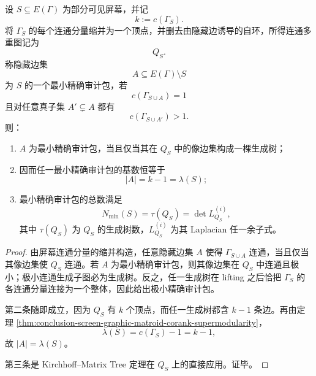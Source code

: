 \begin{theorem}\label{thm:conclusion-screen-minimal-exact-audit-tree-kirchhoff-count}
设 \(S\subseteq E(\Gamma)\) 为部分可见屏幕，并记
\[
k:=c(\Gamma_S).
\]
将 \(\Gamma_S\) 的每个连通分量缩并为一个顶点，并删去由隐藏边诱导的自环，所得连通多重图记为
\[
Q_S.
\]
称隐藏边集
\[
A\subseteq E(\Gamma)\setminus S
\]
为 \(S\) 的一个最小精确审计包，若
\[
c(\Gamma_{S\cup A})=1
\]
且对任意真子集 \(A'\subsetneq A\) 都有
\[
c(\Gamma_{S\cup A'})>1.
\]
则：
\begin{enumerate}
  \item \(A\) 为最小精确审计包，当且仅当其在 \(Q_S\) 中的像边集构成一棵生成树；
  \item 因而任一最小精确审计包的基数恒等于
        \[
        |A|=k-1=\lambda(S);
        \]
  \item 最小精确审计包的总数满足
        \[
        N_{\min}(S)=\tau(Q_S)=\det L_{Q_S}^{(i)},
        \]
        其中 \(\tau(Q_S)\) 为 \(Q_S\) 的生成树数，\(L_{Q_S}^{(i)}\) 为其 Laplacian 任一余子式。
\end{enumerate}
\end{theorem}
\begin{proof}
由屏幕连通分量的缩并构造，任意隐藏边集 \(A\) 使得 \(\Gamma_{S\cup A}\) 连通，当且仅当其像边集使 \(Q_S\) 连通。若 \(A\) 为最小精确审计包，则其像边集在 \(Q_S\) 中连通且极小；极小连通生成子图必为生成树。反之，任一生成树在 lifting 之后恰把 \(\Gamma_S\) 的各连通分量连接为一个整体，因此给出极小精确审计包。

第二条随即成立，因为 \(Q_S\) 有 \(k\) 个顶点，而任一生成树都含 \(k-1\) 条边。再由定理 \ref{thm:conclusion-screen-graphic-matroid-corank-supermodularity}，
\[
\lambda(S)=c(\Gamma_S)-1=k-1,
\]
故 \(|A|=\lambda(S)\)。

第三条是 Kirchhoff--Matrix Tree 定理在 \(Q_S\) 上的直接应用。证毕。
\end{proof}

